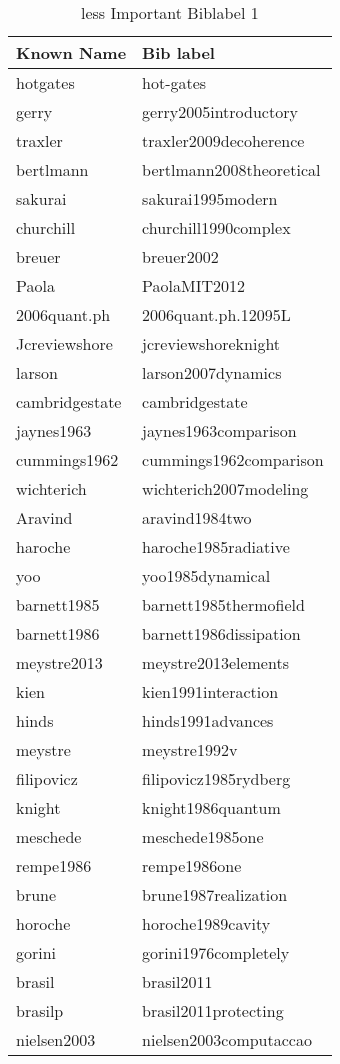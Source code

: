 \documentclass{article}
\begin{document}
\newpage
\begin{table}[!ht]\label{tab:less Important  Biblabel}
\centering
\begin{tabular}{l|l}
Known Name & Bib label \\\hline
hotgates & hot-gates\\
gerry & gerry2005introductory\\
traxler & traxler2009decoherence\\
bertlmann & bertlmann2008theoretical\\
sakurai & sakurai1995modern\\
churchill & churchill1990complex\\
breuer & breuer2002\\
Paola & PaolaMIT2012\\
2006quant.ph  & 2006quant.ph.12095L\\
Jcreviewshore &  jcreviewshoreknight\\
larson  & larson2007dynamics\\
cambridgestate  & cambridgestate\\
jaynes1963 & jaynes1963comparison\\
cummings1962 & cummings1962comparison\\
wichterich  & wichterich2007modeling\\
Aravind & aravind1984two\\
haroche  & haroche1985radiative\\
yoo  & yoo1985dynamical\\
barnett1985 & barnett1985thermofield\\
barnett1986 & barnett1986dissipation\\
meystre2013 & meystre2013elements\\
kien  & kien1991interaction\\
hinds  & hinds1991advances\\
meystre  & meystre1992v\\
filipovicz  & filipovicz1985rydberg\\
knight  & knight1986quantum\\
meschede  & meschede1985one\\
rempe1986 & rempe1986one\\
brune  & brune1987realization\\
horoche  & horoche1989cavity\\
gorini  & gorini1976completely\\
brasil  & brasil2011\\
brasilp & brasil2011protecting\\
nielsen2003 & nielsen2003computaccao
\end{tabular}
\caption{less Important  Biblabel 1}
\end{table} 
\end{document}
